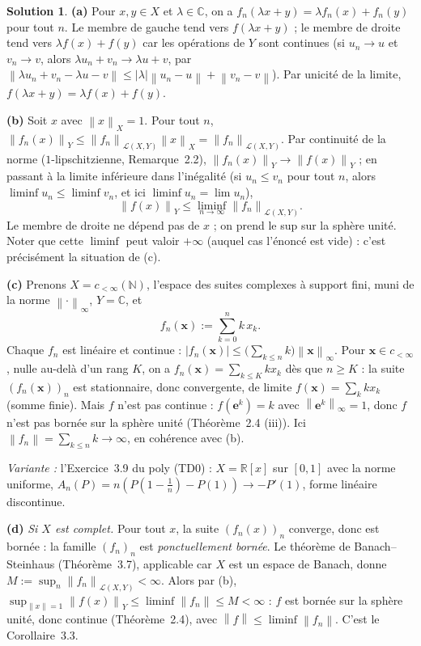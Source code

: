 \documentclass[11pt,a4paper]{article}
\newcommand{\R}{\mathbb{R}}
\newcommand{\N}{\mathbb{N}}
\newcommand{\C}{\mathbb{C}}
\newcommand{\norm}[1]{\left\|#1\right\|}
\newcommand{\Lc}{\mathcal{L}}
\theoremstyle{definition}
\newtheorem*{solution}{Solution}
\begin{document}
\begin{solution}
\noindent\textbf{(a)} Pour $x,y\in X$ et $\lambda\in\C$, on a $f_n(\lambda x+y)=\lambda f_n(x)+f_n(y)$ pour tout $n$. Le membre de gauche tend vers $f(\lambda x+y)$ ; le membre de droite tend vers $\lambda f(x)+f(y)$ car les opérations de $Y$ sont continues (si $u_n\to u$ et $v_n\to v$, alors $\lambda u_n+v_n\to\lambda u+v$, par $\norm{\lambda u_n+v_n-\lambda u-v}\le|\lambda|\norm{u_n-u}+\norm{v_n-v}$). Par unicité de la limite, $f(\lambda x+y)=\lambda f(x)+f(y)$.

\medskip
\noindent\textbf{(b)} Soit $x$ avec $\norm x_X=1$. Pour tout $n$, $\norm{f_n(x)}_Y\le\norm{f_n}_{\Lc(X,Y)}\norm x_X=\norm{f_n}_{\Lc(X,Y)}$. Par continuité de la norme ($1$-lipschitzienne, Remarque~2.2), $\norm{f_n(x)}_Y\to\norm{f(x)}_Y$ ; en passant à la limite inférieure dans l'inégalité (si $u_n\le v_n$ pour tout $n$, alors $\liminf u_n\le\liminf v_n$, et ici $\liminf u_n=\lim u_n$),
\[
\norm{f(x)}_Y\le\liminf_{n\to\infty}\norm{f_n}_{\Lc(X,Y)} .
\]
Le membre de droite ne dépend pas de $x$ ; on prend le sup sur la sphère unité. Noter que cette $\liminf$ peut valoir $+\infty$ (auquel cas l'énoncé est vide) : c'est précisément la situation de (c).

\medskip
\noindent\textbf{(c)} Prenons $X=c_{<\infty}(\N)$, l'espace des suites complexes à support fini, muni de la norme $\norm\cdot_\infty$, $Y=\C$, et
\[
f_n(\mathbf x):=\sum_{k=0}^nk\,x_k .
\]
Chaque $f_n$ est linéaire et continue : $|f_n(\mathbf x)|\le\big(\sum_{k\le n}k\big)\norm{\mathbf x}_\infty$. Pour $\mathbf x\in c_{<\infty}$, nulle au-delà d'un rang $K$, on a $f_n(\mathbf x)=\sum_{k\le K}kx_k$ dès que $n\ge K$ : la suite $(f_n(\mathbf x))_n$ est stationnaire, donc convergente, de limite $f(\mathbf x)=\sum_kkx_k$ (somme finie). Mais $f$ n'est pas continue : $f(\mathbf e^k)=k$ avec $\norm{\mathbf e^k}_\infty=1$, donc $f$ n'est pas bornée sur la sphère unité (Théorème~2.4 (iii)). Ici $\norm{f_n}=\sum_{k\le n}k\to\infty$, en cohérence avec (b).

\emph{Variante :} l'Exercice~3.9 du poly (TD0) : $X=\R[x]$ sur $[0,1]$ avec la norme uniforme, $A_n(P)=n(P(1-\frac1n)-P(1))\to-P'(1)$, forme linéaire discontinue.

\medskip
\noindent\textbf{(d)} \emph{Si $X$ est complet.} Pour tout $x$, la suite $(f_n(x))_n$ converge, donc est bornée : la famille $(f_n)_n$ est \emph{ponctuellement bornée}. Le théorème de Banach--Steinhaus (Théorème~3.7), applicable car $X$ est un espace de Banach, donne $M:=\sup_n\norm{f_n}_{\Lc(X,Y)}<\infty$. Alors par (b), $\sup_{\norm x=1}\norm{f(x)}_Y\le\liminf\norm{f_n}\le M<\infty$ : $f$ est bornée sur la sphère unité, donc continue (Théorème~2.4), avec $\norm f\le\liminf\norm{f_n}$. C'est le Corollaire~3.3.


\end{solution}
\end{document}
